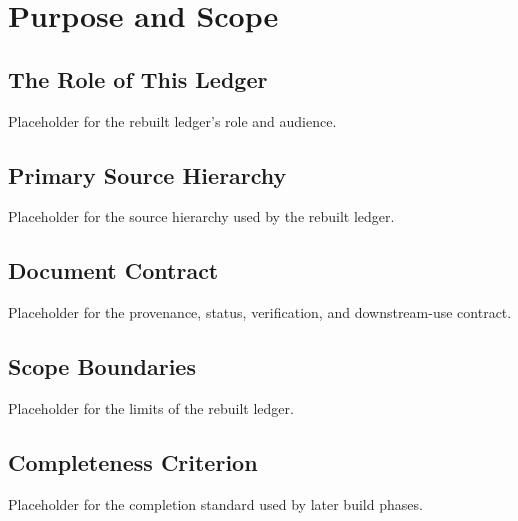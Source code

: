 \chapter{Purpose and Scope}
\label{chap:purpose-scope}


\section{The Role of This Ledger}
\label{sec:purpose-role}

Placeholder for the rebuilt ledger's role and audience.

\section{Primary Source Hierarchy}
\label{sec:purpose-source-hierarchy}

Placeholder for the source hierarchy used by the rebuilt ledger.

\section{Document Contract}
\label{sec:purpose-document-contract}

Placeholder for the provenance, status, verification, and downstream-use contract.

\section{Scope Boundaries}
\label{sec:purpose-scope-boundaries}

Placeholder for the limits of the rebuilt ledger.

\section{Completeness Criterion}
\label{sec:purpose-completeness-criterion}

Placeholder for the completion standard used by later build phases.
